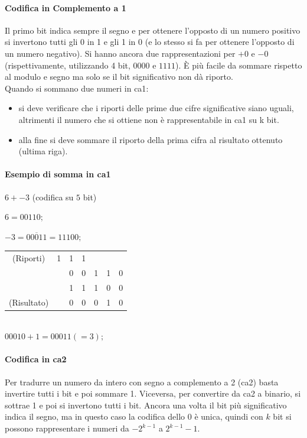 \documentclass[class=book, crop=false, oneside]{standalone}
\begin{document}
\paragraph*{Codifica in Complemento a 1}
Il primo bit indica sempre il segno e per ottenere l'opposto di un numero positivo si invertono tutti gli 0 in 1 e gli 1 in 0 (e lo stesso si fa per ottenere l’opposto di un numero negativo). Si hanno ancora due rappresentazioni per \(+0\) e \(-0\) (rispettivamente, utilizzando 4 bit, \(0000\) e \(1111\)). È più facile da sommare rispetto al modulo e segno ma solo se il bit significativo non dà riporto.\\
Quando si sommano due numeri in \acrshort{ca1}:
\begin{itemize}[noitemsep]
	\item si deve verificare che i riporti delle prime due cifre significative siano uguali, altrimenti il numero che si ottiene non è rappresentabile in \acrshort{ca1} su k bit.
	\item alla fine si deve sommare il riporto della prima cifra al risultato ottenuto (ultima riga).
\end{itemize}
\paragraph*{Esempio di somma in \acrshort{ca1}}
\(6+-3\) (codifica su $5$ bit)

\( 6 = 00110; \)

\( -3 = \overline{00011} = 11100; \)\\

\begin{tabular}{ ccccccc }
	(Riporti) & 1 & 1 & 1 & & & \\
	 & & 0 & 0 & 1 & 1 & 0 \\
	 & & 1 & 1 & 1 & 0 & 0 \\\hline
	(Risultato)& & 0 & 0 & 0 & 1 & 0 \\
\end{tabular}\\

\( 00010 + 1 = 00011 (=3); \)

\paragraph*{Codifica in \acrfull{ca2}}
Per tradurre un numero da intero con segno a complemento a 2 (\acrshort{ca2}) basta invertire tutti i bit e poi sommare 1. Viceversa, per convertire da \acrshort{ca2} a binario, si sottrae 1 e poi si invertono tutti i bit. Ancora una volta il bit più significativo indica il segno, ma in questo caso la codifica dello 0 è unica, quindi con \(k\) bit si possono rappresentare i numeri da \(-2^{k-1}\) a \(2^{k-1}-1\).
\end{document}
